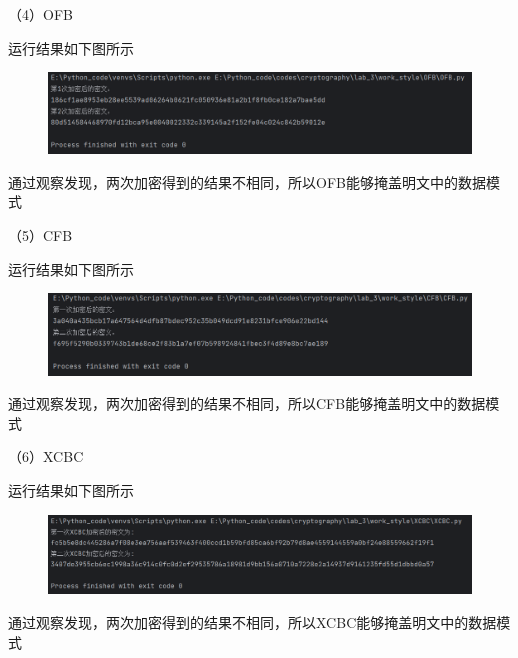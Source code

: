 \documentclass[a4paper,11pt,UTF8]{ctexart}
\newcommand{\bottomcaption}{%
\setlength{\abovecaptionskip}{6pt}%
\setlength{\belowcaptionskip}{6pt}%
\caption}
\newcommand{\xiaowuhao}{\fontsize{9pt}{\baselineskip}\selectfont}   %
\begin{document}
            （4）OFB\par
                运行结果如下图所示
                \begin{figure}[H]
                    \centering
                    \includegraphics[width=13cm]{OFB_result_1.png}
                    \bottomcaption{\xiaowuhao{OFB相同明文加密两次结果}}
                \end{figure}
                通过观察发现，两次加密得到的结果不相同，所以OFB能够掩盖明文中的数据模式\par

            （5）CFB\par
                运行结果如下图所示
                \begin{figure}[H]
                    \centering
                    \includegraphics[width=13cm]{CFB_result_1.png}
                    \bottomcaption{\xiaowuhao{CFB相同明文加密两次结果}}
                \end{figure}
                通过观察发现，两次加密得到的结果不相同，所以CFB能够掩盖明文中的数据模式\par
                
            （6）XCBC\par
                运行结果如下图所示
                \begin{figure}[H]
                    \centering
                    \includegraphics[width=13cm]{XCBC_result_1.png}
                    \bottomcaption{\xiaowuhao{XCBC相同明文加密两次结果}}
                \end{figure}
                通过观察发现，两次加密得到的结果不相同，所以XCBC能够掩盖明文中的数据模式\par
\end{document}
